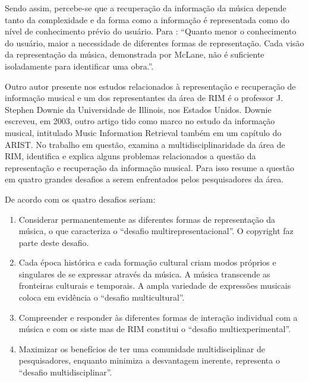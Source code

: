 Sendo assim, percebe-se que a recuperação da informação da música depende tanto da complexidade e da forma como a informação é representada como do nível de conhecimento prévio do usuário. Para : “Quanto menor o conhecimento do usuário, maior a necessidade de diferentes formas de representação. Cada visão da representação da música, demonstrada por McLane, não é suficiente isoladamente para identificar uma obra.”.

Outro autor presente nos estudos relacionados à representação e recuperação de informação musical e um dos representantes da área de RIM é o professor J. Stephen Downie da Universidade de Illinois, nos Estados Unidos. Downie escreveu, em 2003, outro artigo tido como marco no estudo da informação musical, intitulado Music Information Retrieval também em um capítulo do ARIST. No trabalho em questão,  examina a multidisciplinaridade da área de RIM, identifica e explica alguns problemas relacionados a questão da representação e recuperação da informação musical. Para isso  resume a questão em quatro grandes desafios a serem enfrentados pelos pesquisadores da área.

De acordo com  os quatro desafios seriam:

\begin{citacao}
    \begin{enumerate}
        \item Considerar permanentemente as diferentes formas de representação da música, o que caracteriza o “desafio multirepresentacional”. O copyright faz parte deste desafio.
        \item Cada época histórica e cada formação cultural criam modos próprios e singulares de se expressar através da música. A música transcende as fronteiras culturais e temporais. A ampla variedade de expressões musicais coloca em evidência o “desafio multicultural”.
        \item Compreender e responder às diferentes formas de interação individual com a música e com os siste mas de RIM constitui o “desafio multiexperimental”.
        \item Maximizar os benefícios de ter uma comunidade multidisciplinar de pesquisadores, enquanto minimiza a desvantagem inerente, representa o “desafio multidisciplinar”.
    \end{enumerate}
\end{citacao}

